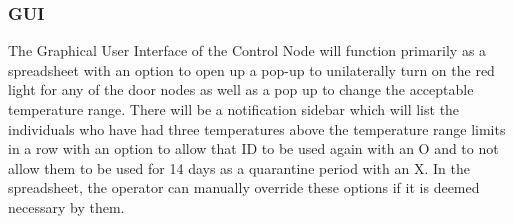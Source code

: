 \subsubsection{GUI}
The Graphical User Interface of the Control Node will function primarily as a spreadsheet with an option to open up a pop-up to unilaterally turn on the red light for any of the door nodes as well as a pop up to change the acceptable temperature range. There will be a notification sidebar which will list the individuals who have had three temperatures above the temperature range limits in a row with an option to allow that ID to be used again with an O and to not allow them to be used for 14 days as a quarantine period with an X. In the spreadsheet, the operator can manually override these options if it is deemed necessary by them.
